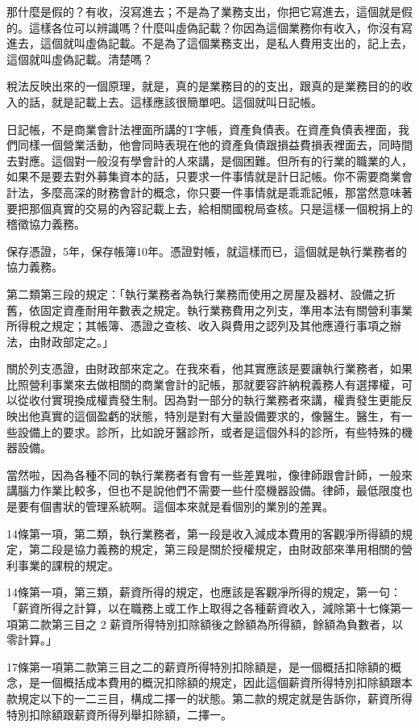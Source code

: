 \documentclass[]{ctexbook}
\begin{document}
那什麼是假的？有收，沒寫進去；不是為了業務支出，你把它寫進去，這個就是假的。這樣各位可以辨識嗎？什麼叫虛偽記載？你因為這個業務你有收入，你沒有寫進去，這個就叫虛偽記載。不是為了這個業務支出，是私人費用支出的，記上去，這個就叫虛偽記載。清楚嗎？

稅法反映出來的一個原理，就是，真的是業務目的的支出，跟真的是業務目的的收入的話，就是記載上去。這樣應該很簡單吧。這個就叫日記帳。

日記帳，不是商業會計法裡面所講的T字帳，資產負債表。在資產負債表裡面，我們同樣一個營業活動，他會同時表現在他的資產負債跟損益費損表裡面去，同時間去對應。這個對一般沒有學會計的人來講，是個困難。但所有的行業的職業的人，如果不是要去對外募集資本的話，只要求一件事情就是計日記帳。你不需要商業會計法，多麼高深的財務會計的概念，你只要一件事情就是乖乖記帳，那當然意味著要把那個真實的交易的內容記載上去，給相關國稅局查核。只是這樣一個稅捐上的稽徵協力義務。

保存憑證，5年，保存帳簿10年。憑證對帳，就這樣而已，這個就是執行業務者的協力義務。

第二類第三段的規定：「執行業務者為執行業務而使用之房屋及器材、設備之折舊，依固定資產耐用年數表之規定。執行業務費用之列支，準用本法有關營利事業所得稅之規定；其帳簿、憑證之查核、收入與費用之認列及其他應遵行事項之辦法，由財政部定之。」

關於列支憑證，由財政部來定之。在我來看，他其實應該是要讓執行業務者，如果比照營利事業來去做相關的商業會計的記帳，那就要容許納稅義務人有選擇權，可以從收付實現換成權責發生制。因為對一部分的執行業務者來講，權責發生更能反映出他真實的這個盈虧的狀態，特別是對有大量設備要求的，像醫生。醫生，有一些設備上的要求。診所，比如說牙醫診所，或者是這個外科的診所，有些特殊的機器設備。

當然啦，因為各種不同的執行業務者有會有一些差異啦，像律師跟會計師，一般來講腦力作業比較多，但也不是說他們不需要一些什麼機器設備。律師，最低限度也是要有個書狀的管理系統啊。這個本來就是看個別的業別的差異。

14條第一項，第二類，執行業務者，第一段是收入減成本費用的客觀凈所得額的規定，第二段是協力義務的規定，第三段是關於授權規定，由財政部來準用相關的營利事業的課稅的規定。

14條第一項，第三類，薪資所得的規定，也應該是客觀凈所得的規定，第一句：「薪資所得之計算，以在職務上或工作上取得之各種薪資收入，減除第十七條第一項第二款第三目之 2 薪資所得特別扣除額後之餘額為所得額，餘額為負數者，以零計算。」

17條第一項第二款第三目之二的薪資所得特別扣除額是，是一個概括扣除額的概念，是一個概括成本費用的概況扣除額的規定，因此這個薪資所得特別扣除額跟本款規定以下的一二三目，構成二擇一的狀態。第二款的規定就是告訴你，薪資所得特別扣除額跟薪資所得列舉扣除額，二擇一。
\end{document}
